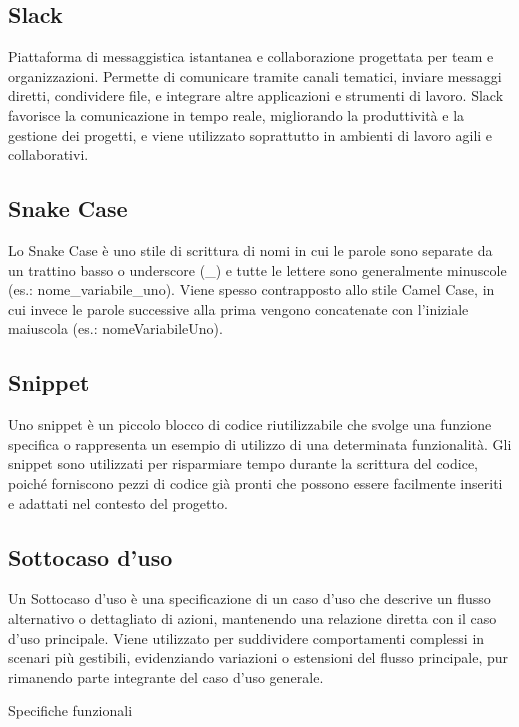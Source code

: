 \hypertarget{sec:slack}{}
\subsection*{Slack}
Piattaforma di messaggistica istantanea e collaborazione progettata per team e organizzazioni. Permette di comunicare tramite canali tematici, inviare 
messaggi diretti, condividere file, e integrare altre applicazioni e strumenti di lavoro. Slack favorisce la comunicazione in tempo reale, migliorando 
la produttività e la gestione dei progetti, e viene utilizzato soprattutto in ambienti di lavoro agili e collaborativi.

\hypertarget{sec:snake_case}{}
\subsection*{Snake Case}
Lo Snake Case è uno stile di scrittura di nomi in cui le parole sono separate da un trattino basso o underscore (\_) e tutte le lettere sono generalmente 
minuscole (es.: nome\_variabile\_uno). Viene spesso contrapposto allo stile Camel Case, in cui invece le parole successive alla prima vengono concatenate 
con l’iniziale maiuscola (es.: nomeVariabileUno).

\hypertarget{sec:snippet}{}
\subsection*{Snippet}
Uno snippet è un piccolo blocco di codice riutilizzabile che svolge una funzione specifica o rappresenta un esempio di utilizzo di una determinata 
funzionalità. Gli snippet sono utilizzati per risparmiare tempo durante la scrittura del codice, poiché forniscono pezzi di codice già pronti che possono 
essere facilmente inseriti e adattati nel contesto del progetto.

\hypertarget{sec:sottocaso_d'uso}{}
\subsection*{Sottocaso d'uso}
Un Sottocaso d'uso è una specificazione di un caso d'uso che descrive un flusso alternativo o dettagliato di azioni, mantenendo una relazione diretta con 
il caso d'uso principale. Viene utilizzato per suddividere comportamenti complessi in scenari più gestibili, evidenziando variazioni o estensioni del 
flusso principale, pur rimanendo parte integrante del caso d'uso generale.

\hypertarget{sec:specifiche_funzionali}{Specifiche funzionali}
